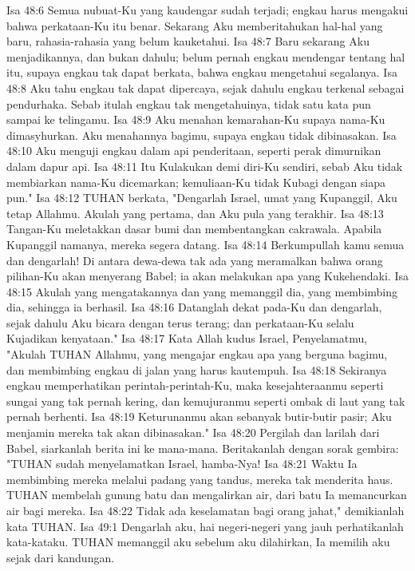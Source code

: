 Isa 48:6  Semua nubuat-Ku yang kaudengar sudah terjadi; engkau harus mengakui bahwa perkataan-Ku itu benar. Sekarang Aku memberitahukan hal-hal yang baru, rahasia-rahasia yang belum kauketahui.
Isa 48:7  Baru sekarang Aku menjadikannya, dan bukan dahulu; belum pernah engkau mendengar tentang hal itu, supaya engkau tak dapat berkata, bahwa engkau mengetahui segalanya.
Isa 48:8  Aku tahu engkau tak dapat dipercaya, sejak dahulu engkau terkenal sebagai pendurhaka. Sebab itulah engkau tak mengetahuinya, tidak satu kata pun sampai ke telingamu.
Isa 48:9  Aku menahan kemarahan-Ku supaya nama-Ku dimasyhurkan. Aku menahannya bagimu, supaya engkau tidak dibinasakan.
Isa 48:10  Aku menguji engkau dalam api penderitaan, seperti perak dimurnikan dalam dapur api.
Isa 48:11  Itu Kulakukan demi diri-Ku sendiri, sebab Aku tidak membiarkan nama-Ku dicemarkan; kemuliaan-Ku tidak Kubagi dengan siapa pun."
Isa 48:12  TUHAN berkata, "Dengarlah Israel, umat yang Kupanggil, Aku tetap Allahmu. Akulah yang pertama, dan Aku pula yang terakhir.
Isa 48:13  Tangan-Ku meletakkan dasar bumi dan membentangkan cakrawala. Apabila Kupanggil namanya, mereka segera datang.
Isa 48:14  Berkumpullah kamu semua dan dengarlah! Di antara dewa-dewa tak ada yang meramalkan bahwa orang pilihan-Ku akan menyerang Babel; ia akan melakukan apa yang Kukehendaki.
Isa 48:15  Akulah yang mengatakannya dan yang memanggil dia, yang membimbing dia, sehingga ia berhasil.
Isa 48:16  Datanglah dekat pada-Ku dan dengarlah, sejak dahulu Aku bicara dengan terus terang; dan perkataan-Ku selalu Kujadikan kenyataan."
Isa 48:17  Kata Allah kudus Israel, Penyelamatmu, "Akulah TUHAN Allahmu, yang mengajar engkau apa yang berguna bagimu, dan membimbing engkau di jalan yang harus kautempuh.
Isa 48:18  Sekiranya engkau memperhatikan perintah-perintah-Ku, maka kesejahteraanmu seperti sungai yang tak pernah kering, dan kemujuranmu seperti ombak di laut yang tak pernah berhenti.
Isa 48:19  Keturunanmu akan sebanyak butir-butir pasir; Aku menjamin mereka tak akan dibinasakan."
Isa 48:20  Pergilah dan larilah dari Babel, siarkanlah berita ini ke mana-mana. Beritakanlah dengan sorak gembira: "TUHAN sudah menyelamatkan Israel, hamba-Nya!
Isa 48:21  Waktu Ia membimbing mereka melalui padang yang tandus, mereka tak menderita haus. TUHAN membelah gunung batu dan mengalirkan air, dari batu Ia memancurkan air bagi mereka.
Isa 48:22  Tidak ada keselamatan bagi orang jahat," demikianlah kata TUHAN.
Isa 49:1  Dengarlah aku, hai negeri-negeri yang jauh perhatikanlah kata-kataku. TUHAN memanggil aku sebelum aku dilahirkan, Ia memilih aku sejak dari kandungan.
